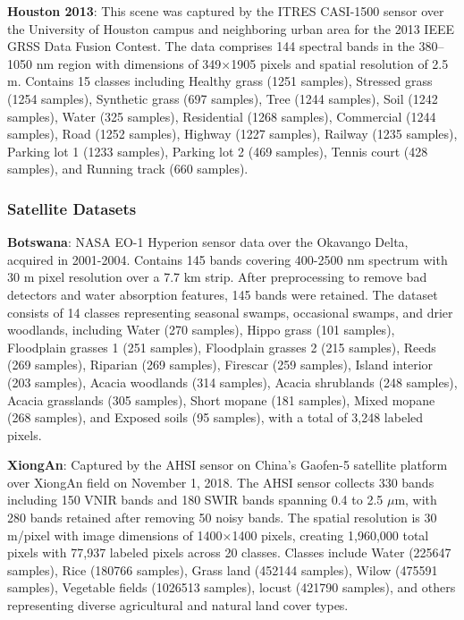 \documentclass[journal]{IEEEtran}
\begin{document}
\textbf{Houston 2013}: This scene was captured by the ITRES CASI-1500 sensor over the University of Houston campus and neighboring urban area for the 2013 IEEE GRSS Data Fusion Contest. The data comprises 144 spectral bands in the 380--1050 nm region with dimensions of 349$\times$1905 pixels and spatial resolution of 2.5 m. Contains 15 classes including Healthy grass (1251 samples), Stressed grass (1254 samples), Synthetic grass (697 samples), Tree (1244 samples), Soil (1242 samples), Water (325 samples), Residential (1268 samples), Commercial (1244 samples), Road (1252 samples), Highway (1227 samples), Railway (1235 samples), Parking lot 1 (1233 samples), Parking lot 2 (469 samples), Tennis court (428 samples), and Running track (660 samples).

\subsubsection{Satellite Datasets}

\textbf{Botswana}: NASA EO-1 Hyperion sensor data over the Okavango Delta, acquired in 2001-2004. Contains 145 bands covering 400-2500 nm spectrum with 30 m pixel resolution over a 7.7 km strip. After preprocessing to remove bad detectors and water absorption features, 145 bands were retained. The dataset consists of 14 classes representing seasonal swamps, occasional swamps, and drier woodlands, including Water (270 samples), Hippo grass (101 samples), Floodplain grasses 1 (251 samples), Floodplain grasses 2 (215 samples), Reeds (269 samples), Riparian (269 samples), Firescar (259 samples), Island interior (203 samples), Acacia woodlands (314 samples), Acacia shrublands (248 samples), Acacia grasslands (305 samples), Short mopane (181 samples), Mixed mopane (268 samples), and Exposed soils (95 samples), with a total of 3,248 labeled pixels.

\textbf{XiongAn}: Captured by the AHSI sensor on China's Gaofen-5 satellite platform over XiongAn field on November 1, 2018. The AHSI sensor collects 330 bands including 150 VNIR bands and 180 SWIR bands spanning 0.4 to 2.5 $\mu$m, with 280 bands retained after removing 50 noisy bands. The spatial resolution is 30 m/pixel with image dimensions of 1400$\times$1400 pixels, creating 1,960,000 total pixels with 77,937 labeled pixels across 20 classes. Classes include Water (225647 samples), Rice (180766 samples), Grass land (452144 samples), Wilow (475591 samples), Vegetable fields (1026513 samples), locust (421790 samples), and others representing diverse agricultural and natural land cover types.
\end{document}
